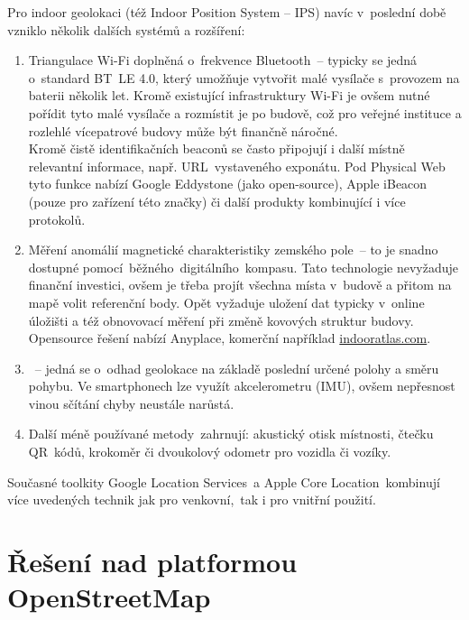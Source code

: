 Pro indoor geolokaci (též Indoor Position System -- IPS) navíc v~poslední době vzniklo několik dalších systémů a rozšíření:

\begin{enumerate}

\item
  Triangulace Wi-Fi doplněná o~frekvence Bluetooth~-- typicky se jedná o~standard BT~LE 4.0, který umožňuje vytvořit malé vysílače s~provozem na baterii několik let. Kromě existující infrastruktury Wi-Fi je ovšem nutné pořídit tyto malé vysílače a rozmístit je po budově, což pro veřejné instituce a rozlehlé vícepatrové budovy může být finančně náročné.\\[2\baselineskip]Kromě čistě identifikačních beaconů se často připojují i další místně relevantní informace, např. URL~vystaveného exponátu. Pod  Physical Web tyto funkce nabízí Google Eddystone (jako open-source), Apple iBeacon (pouze pro zařízení této značky) či další produkty kombinující i více protokolů.
\item
  Měření anomálií magnetické charakteristiky zemského pole~-- to je snadno dostupné pomocí~běžného~digitálního~kompasu. Tato technologie nevyžaduje finanční investici, ovšem je třeba projít všechna místa v~budově a přitom na mapě volit referenční body. Opět vyžaduje uložení dat typicky v~online úložišti a též obnovovací měření při změně kovových struktur budovy.\cite{zdroj35}\\[2\baselineskip]Opensource řešení nabízí Anyplace, komerční například \href{http://indooratlas.com}{indooratlas.com}.
\item
  \cite{zdroj36}~-- jedná se o~odhad geolokace na základě poslední určené polohy a směru pohybu. Ve smartphonech lze využít akcelerometru (IMU), ovšem nepřesnost vinou sčítání chyby neustále narůstá.
\item
  Další méně používané metody\cite{zdroj37}~zahrnují: akustický otisk místnosti\cite{zdroj38}, čtečku QR~kódů, krokoměr či dvoukolový odometr pro vozidla či vozíky.
\end{enumerate}

Současné toolkity Google Location Services~a Apple Core Location~kombinují více uvedených technik jak pro venkovní,~tak i pro vnitřní použití.



\chapter{Řešení nad platformou OpenStreetMap}\label{ux159eux161enuxed-nad-platformou-openstreetmap}

